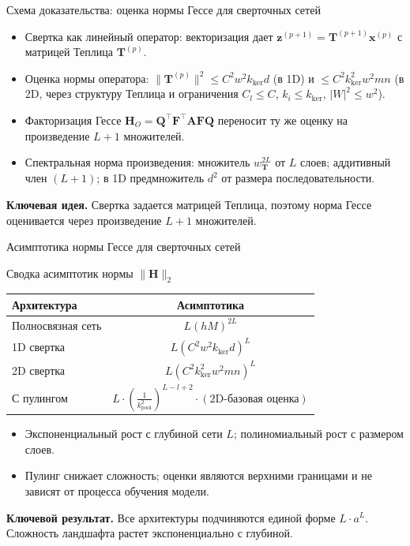 \documentclass[10pt,pdf,hyperref={unicode}]{beamer}
\newcommand{\key}[1]{\textbf{\color{darkgreen}#1}}
\begin{document}
\begin{frame}{Схема доказательства: оценка нормы Гессе для сверточных сетей}
\justifying
\footnotesize
\begin{itemize}
    \item Свертка как линейный оператор: векторизация дает $\mathbf{z}^{(p+1)} = \mathbf{T}^{(p+1)}\mathbf{x}^{(p)}$ с матрицей Теплица $\mathbf{T}^{(p)}$.
    \item Оценка нормы оператора: $\|\mathbf{T}^{(p)}\|^2 \leqslant C^2 w^2 k_{\mathrm{ker}} d$ (в 1D) и $\leqslant C^2 k_{\mathrm{ker}}^2 w^2 mn$ (в 2D, через структуру Теплица и ограничения $C_l\leqslant C$, $k_i\leqslant k_{\mathrm{ker}}$, $|W|^2\leqslant w^2$).
    \item Факторизация Гессе $\mathbf{H}_O = \mathbf{Q}^{\top}\mathbf{F}^{\top}\mathbf{A}\mathbf{F}\mathbf{Q}$ переносит ту же оценку на произведение $L+1$ множителей.
    \item Спектральная норма произведения: множитель $w_{\mathbf{T}}^{2L}$ от $L$ слоев; аддитивный член $(L+1)$; в 1D предмножитель $d^2$ от размера последовательности.
\end{itemize}

\vspace{0.15em}
\key{Ключевая идея.} Свертка задается матрицей Теплица, поэтому норма Гессе оценивается через произведение $L+1$ множителей.
\end{frame}
\begin{frame}{Асимптотика нормы Гессе для сверточных сетей}
\justifying

\begin{block}{Сводка асимптотик нормы $\|\mathbf{H}\|_2$}
\begin{tabular}{|l|c|}
\hline
\textbf{Архитектура} & \textbf{Асимптотика} \\
\hline
Полносвязная сеть & $L(hM)^{2L}$ \\
\hline
1D свертка & $L(C^2w^2k_{\mathrm{ker}}d)^L$ \\
\hline
2D свертка & $L(C^2k_{\mathrm{ker}}^2w^2mn)^L$ \\
\hline
С пулингом & $L\cdot\left(\frac{1}{k_{\mathrm{pool}}^2}\right)^{L-l+2}\cdot(\text{2D-базовая оценка})$ \\
\hline
\end{tabular}
\end{block}

\begin{itemize}
    \item Экспоненциальный рост с глубиной сети $L$; полиномиальный рост с размером слоев.
    \item Пулинг снижает сложность; оценки являются верхними границами и не зависят от процесса обучения модели.
\end{itemize}

\vspace{0.15em}
\key{Ключевой результат.} Все архитектуры подчиняются единой форме $L\cdot a^{L}$. Сложность ландшафта растет экспоненциально с глубиной.
\end{frame}
\end{document}
